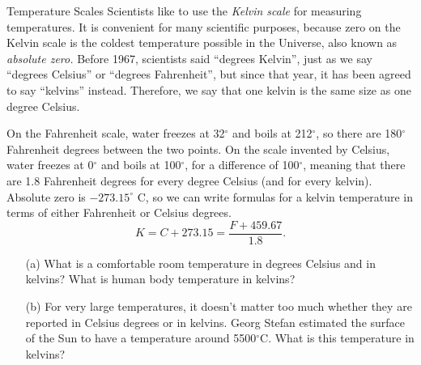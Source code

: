 \documentclass[12pt]{article}
\begin{document}
\begin{probdesc}{3}{Temperature Scales}
Scientists like to use the {\em Kelvin scale} for measuring
temperatures.  It is convenient for many scientific purposes, because
zero on the Kelvin scale is the coldest temperature possible in the
Universe, also known as {\em absolute zero.}  Before 1967, scientists
said ``degrees Kelvin'', just as we say ``degrees Celsius'' or
``degrees Fahrenheit'', but since that year, it has been agreed to say
``kelvins'' instead.  Therefore, we say that one kelvin is the same
size as one degree Celsius.

On the Fahrenheit scale, water freezes at 32$^\circ$ and boils at
212$^\circ$, so there are 180$^\circ$ Fahrenheit degrees between the
two points.  On the scale invented by Celsius, water freezes at
0$^\circ$ and boils at 100$^\circ$, for a difference of
100$^\circ$, meaning that there are 1.8 Fahrenheit degrees for every
degree Celsius (and for every kelvin).  Absolute zero is
$-273.15^\circ$ C, so we can write formulas for a kelvin temperature
in terms of either Fahrenheit or Celsius degrees.
\begin{equation}
K = C + 273.15 = \frac{F + 459.67}{1.8}.
\end{equation}

\begin{enumerate}
\item[(a)] What is a comfortable room temperature in degrees Celsius
  and in kelvins?  What is human body temperature in kelvins?

\item[(b)] For very large temperatures, it doesn't matter too much
  whether they are reported in Celsius degrees or in kelvins.  Georg
  Stefan estimated the surface of the Sun to have a temperature around
  5500$^\circ$C.  What is this temperature in kelvins? 
\end{enumerate}

\end{probdesc}
\end{document}
